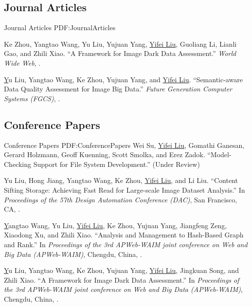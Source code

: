 \documentclass[letterpaper,10pt,oneside]{article}
\begin{document}
\begin{body}
\subsection
{Journal Articles}
{Journal Articles}
{PDF:JournalArticles}
\GapNoBreak

\NumberedItem{[1]}
Ke Zhou, Yangtao Wang, Yu Liu, Yujuan Yang, \underline{Yifei Liu}, Guoliang Li, Lianli Gao, and Zhili Xiao.
``A Framework for Image Dark Data Assessment.'' 
\textit{World Wide Web},
.

\BigGap
\NumberedItem{[2]}
\href{https://www.sciencedirect.com/science/article/pii/S0167739X19302304}
Yu Liu, Yangtao Wang, Ke Zhou, Yujuan Yang, and \underline{Yifei Liu}.
``Semantic-aware Data Quality Assessment for Image Big Data.'' 
\textit{Future Generation Computer Systems (FGCS)},
.
\BigGap
\GapNoBreak

\subsection
{Conference Papers}
{Conference Papers}
{PDF:ConferencePapers}
\GapNoBreak
\NumberedItem{[1]}
Wei Su, \underline{Yifei Liu}, Gomathi Ganesan, Gerard Holzmann, Geoff Kuenning, Scott Smolka, and Erez Zadok.
``Model-Checking Support for File System Development.'' (Under Review)

\BigGap
\NumberedItem{[2]}
Yu Liu, Hong Jiang, Yangtao Wang, Ke Zhou, \underline{Yifei Liu}, and Li Liu.
``Content Sifting Storage: Achieving Fast Read for Large-scale Image Dataset Analysis.''
In \textit{Proceedings of the 57th Design Automation Conference (DAC)}, San Francisco, CA,
.

\BigGap
\NumberedItem{[3]}
\href{https://link.springer.com/chapter/10.1007/978-3-030-26072-9_22}
Yangtao Wang, Yu Liu, \underline{Yifei Liu}, Ke Zhou, Yujuan Yang, Jiangfeng Zeng, Xiaodong Xu, and Zhili Xiao.
``Analysis and Management to Hash-Based Graph and Rank.''
In \textit{Proceedings of the 3rd APWeb-WAIM joint conference on Web and Big Data (APWeb-WAIM)}, Chengdu, China,
.

\BigGap
\NumberedItem{[4]}
\href{https://link.springer.com/chapter/10.1007/978-3-030-26072-9_1}
Yu Liu, Yangtao Wang, Ke Zhou, Yujuan Yang, \underline{Yifei Liu}, Jingkuan Song, and Zhili Xiao.
``A Framework for Image Dark Data Assessment.''
In \textit{Proceedings of the 3rd APWeb-WAIM joint conference on Web and Big Data (APWeb-WAIM)}, Chengdu, China,
.


\end{body}
\end{document}
